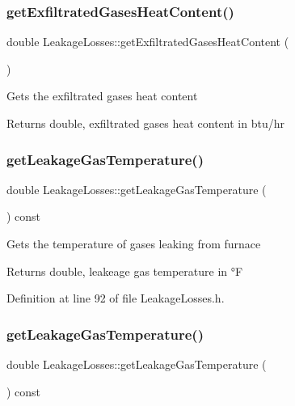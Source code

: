 \subsubsection{\texorpdfstring{get\+Exfiltrated\+Gases\+Heat\+Content()}{getExfiltratedGasesHeatContent()}\hspace{0.1cm}{\footnotesize\ttfamily [3/3]}}
{\footnotesize\ttfamily double Leakage\+Losses\+::get\+Exfiltrated\+Gases\+Heat\+Content (\begin{DoxyParamCaption}{ }\end{DoxyParamCaption})}

Gets the exfiltrated gases heat content \begin{DoxyReturn}{Returns}
double, exfiltrated gases heat content in btu/hr 
\end{DoxyReturn}
\mbox{\label{class_leakage_losses_a5dbb249c07bc91611b71d62610af7234}} 
\subsubsection{\texorpdfstring{get\+Leakage\+Gas\+Temperature()}{getLeakageGasTemperature()}\hspace{0.1cm}{\footnotesize\ttfamily [1/3]}}
{\footnotesize\ttfamily double Leakage\+Losses\+::get\+Leakage\+Gas\+Temperature (\begin{DoxyParamCaption}{ }\end{DoxyParamCaption}) const\hspace{0.3cm}{\ttfamily [inline]}}

Gets the temperature of gases leaking from furnace \begin{DoxyReturn}{Returns}
double, leakeage gas temperature in °F 
\end{DoxyReturn}


Definition at line 92 of file Leakage\+Losses.\+h.

\mbox{\label{class_leakage_losses_a5dbb249c07bc91611b71d62610af7234}} 
\subsubsection{\texorpdfstring{get\+Leakage\+Gas\+Temperature()}{getLeakageGasTemperature()}\hspace{0.1cm}{\footnotesize\ttfamily [2/3]}}
{\footnotesize\ttfamily double Leakage\+Losses\+::get\+Leakage\+Gas\+Temperature (\begin{DoxyParamCaption}{ }\end{DoxyParamCaption}) const\hspace{0.3cm}{\ttfamily [inline]}}

